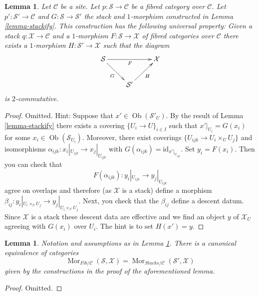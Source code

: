 \documentclass{stacks-project}
\theoremstyle{plain}
\newtheorem{lemma}[subsection]{Lemma}
\theoremstyle{definition}
\theoremstyle{remark}
\numberwithin{equation}{subsection}
\def\Mor{\mathop{\mathrm{Mor}}\nolimits}
\def\Ob{\mathop{\mathrm{Ob}}\nolimits}
\begin{document}
\begin{lemma}
\label{lemma-stackify-universal-property}
Let $\mathcal{C}$ be a site.
Let $p : \mathcal{S} \to \mathcal{C}$ be a fibred category over $\mathcal{C}$.
Let $p' : \mathcal{S}' \to \mathcal{C}$ and $G : \mathcal{S} \to \mathcal{S}'$
the stack and $1$-morphism constructed in Lemma \ref{lemma-stackify}.
This construction has the following universal property: Given a stack
$q : \mathcal{X} \to \mathcal{C}$ and a $1$-morphism
$F : \mathcal{S} \to \mathcal{X}$ of fibred categories over $\mathcal{C}$
there exists a $1$-morphism $H : \mathcal{S}' \to \mathcal{X}$
such that the diagram
$$
\xymatrix{
\mathcal{S} \ar[rr]_F \ar[rd]_G & & \mathcal{X} \\
& \mathcal{S}' \ar[ru]_H
}
$$
is $2$-commutative.
\end{lemma}

\begin{proof}
Omitted. Hint: Suppose that $x' \in \Ob(\mathcal{S}'_U)$.
By the result of Lemma \ref{lemma-stackify}
there exists a covering $\{U_i \to U\}_{i \in I}$
such that $x'|_{U_i} = G(x_i)$ for some $x_i \in \Ob(\mathcal{S}_{U_i})$.
Moreover, there exist coverings $\{U_{ijk} \to U_i \times_U U_j\}$
and isomorphisms $\alpha_{ijk} : x_i|_{U_{ijk}} \to x_j|_{U_{ijk}}$
with $G(\alpha_{ijk}) = \text{id}_{x'|_{U_{ijk}}}$. Set $y_i = F(x_i)$.
Then you can check that
$$
F(\alpha_{ijk}) : y_i|_{U_{ijk}} \to y_j|_{U_{ijk}}
$$
agree on overlaps and therefore (as $\mathcal{X}$ is a stack) define
a morphism $\beta_{ij} : y_i|_{U_i \times_U U_j} \to y_j|_{U_i \times_U U_j}$.
Next, you check that the $\beta_{ij}$ define a descent datum. Since
$\mathcal{X}$ is a stack these descent data are effective and we find
an object $y$ of $\mathcal{X}_U$ agreeing with $G(x_i)$ over $U_i$.
The hint is to set $H(x') = y$.
\end{proof}

\begin{lemma}
\label{lemma-stackify-universal-property-more}
Notation and assumptions as in
Lemma \ref{lemma-stackify-universal-property}.
There is a canonical equivalence of categories
$$
\Mor_{\textit{Fib}/\mathcal{C}}(\mathcal{S}, \mathcal{X})
=
\Mor_{\textit{Stacks}/\mathcal{C}}(\mathcal{S}', \mathcal{X})
$$
given by the constructions in the proof of the aforementioned lemma.
\end{lemma}

\begin{proof}
Omitted.
\end{proof}
\end{document}
